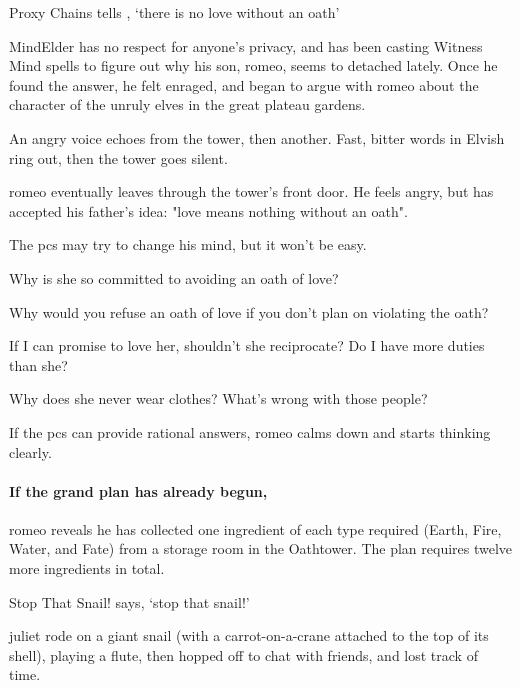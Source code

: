 {Proxy Chains}%
{ tells , `there is no love without an oath'}%

\Gls{MindElder} has no respect for anyone's privacy, and has been casting Witness Mind spells to figure out why his son, \gls{romeo}, seems to detached lately.
Once he found the answer, he felt enraged, and began to argue with \gls{romeo} about the character of the unruly elves in the great plateau gardens.


\begin{boxtext}
  An angry voice echoes from the tower, then another.
  Fast, bitter words in Elvish ring out, then the tower goes silent.
\end{boxtext}

\Gls{romeo} eventually leaves through the tower's front door.
He feels angry, but has accepted his father's idea: "love means nothing without an oath".

The \glspl{pc} may try to change his mind, but it won't be easy.

\begin{speechtext}
  Why is she so committed to avoiding an oath of love?

  Why would you refuse an oath of love if you don't plan on violating the oath?

  If I can promise to love her, shouldn't she reciprocate?
  Do I have more duties than she?

  Why does she never wear clothes?
  What's wrong with those people?
\end{speechtext}

If the \glspl{pc} can provide rational answers, \gls{romeo} calms down and starts thinking clearly.

\paragraph{If the grand plan has already begun,}
\Gls{romeo} reveals he has collected one \gls{ingredient} of each type required (Earth, Fire, Water, and Fate) from a storage room in the Oathtower.
The plan requires twelve more \glspl{ingredient} in total.

{Stop That Snail!}%
{ says, `stop that snail!'}%

\Gls{juliet} rode on a giant snail (with a carrot-on-a-crane attached to the top of its shell), playing a flute, then hopped off to chat with friends, and lost track of time.

